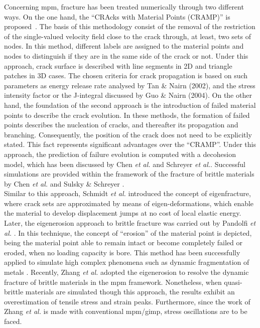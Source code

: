 \documentclass[preprint,12pt,a4paper]{elsarticle}
\begin{document}
Concerning \acrshort{mpm}, fracture has been treated numerically through two different ways. On the one hand, the ``CRAcks with Material Points (CRAMP)'' is proposed~\cite{Nairn_2003,Nairn_2006}. The basis of this methodology consist of the removal of the restriction
of the single-valued velocity field close to the crack through, at least, two sets of nodes. In this method, different labels are assigned to the material points
and nodes to distinguish if they are in the same side of the crack or
not. Under this approach, crack surface is described with line segments
in 2D and triangle patches in 3D cases. The chosen criteria for crack
propagation is based on such parameters as energy release rate
analysed by Tan \& Nairn (2002)\cite{Nairn_2002}, and the stress
intensity factor or the J-integral discussed by Guo \& Nairn
(2004)\cite{Nairn_2004}. 
On the other hand, the foundation of the second approach is the introduction of failed
material points to describe the crack evolution. In these methods, the
formation of failed points describes the nucleation of cracks, and
thereafter its propagation and branching. Consequently, the position
of the crack does not need to be explicitly stated. This fact represents
significant advantages over the ``CRAMP''. Under this approach, the
prediction of failure evolution is computed with a decohesion model,
which has been discussed by Chen {\it et al.}\cite{Zhenmao_2005} and
Schreyer {\it et al.}\cite{Schreyer_2002}. Successful simulations are provided within the framework of the fracture of brittle materials by Chen {\it et
  al.} \cite{Chen_2002,Chen_2003} and Sulsky \& Schreyer
\cite{Sulsky_2004}.\\

Similar to this approach, Schmidt {\it et al.}
\cite{Schmidt_2009} introduced the concept of eigenfracture, where
crack sets are approximated by means of eigen-deformations, which
enable the material to develop displacement jumps at no cost of local
elastic energy. Later, the eigenerosion approach to brittle fracture
was carried out by Pandolfi {\it et al.}
\cite{Pandolfi_2012,Pandolfi_2013}. In this technique, the concept of ``erosion'' of
the material point is depicted, being the material point able to remain intact or become completely failed or eroded, when no loading
capacity is bore. This method has been successfully applied to simulate high
complex phenomena such as dynamic fragmentation of metals
\cite{Li_2015}. Recently, Zhang {\it et al.}
\cite{Zhang_EE_2020} adopted the eigenerosion to resolve the dynamic
fracture of brittle materials in the \acrshort{mpm}
framework. Nonetheless, when quasi-brittle materials are simulated
though this approach, the results exhibit an overestimation of tensile
stress and strain peaks. Furthermore, since the work of Zhang {\it et al.}
\cite{Zhang_EE_2020} is made with conventional \acrshort{mpm}/\acrshort{gimp}, stress oscillations are to be faced.\\
\end{document}
